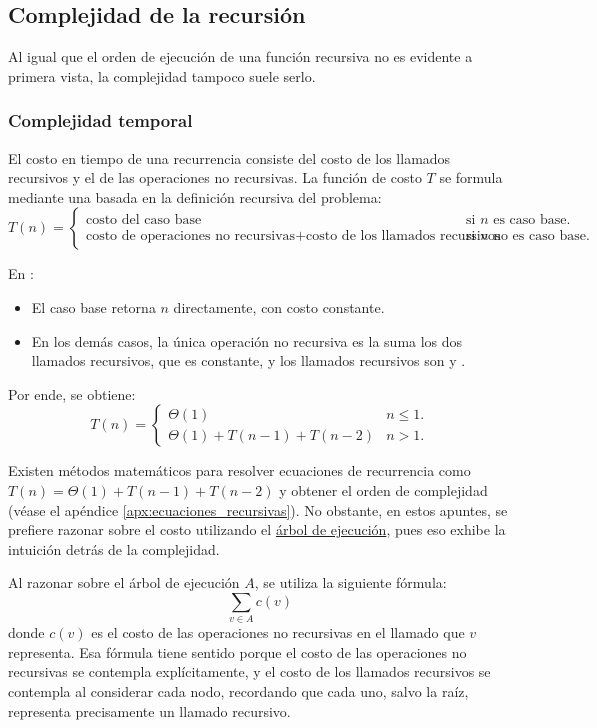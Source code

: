 \subsection{Complejidad de la recursión}

Al igual que el orden de ejecución de una función recursiva no es evidente a primera vista, la complejidad tampoco suele serlo.

\subsubsection{Complejidad temporal}
\label{sec:complejidad-temporal-recursion}

El costo en tiempo de una recurrencia consiste del costo de los llamados recursivos y el de las operaciones no recursivas. La función de costo \(T\) se formula mediante una  basada en la definición recursiva del problema:
\[
T(n) =
\begin{cases}
  \text{costo del caso base} & \text{si \(n\) es caso base.} \\
  \text{costo de operaciones no recursivas} + \text{costo de los llamados recursivos} & \text{si \(n\) no es caso base.}
\end{cases}
\]

En :
\begin{itemize}
  \item El caso base retorna $n$ directamente, con costo constante.
  \item En los demás casos, la única operación no recursiva es la suma los dos llamados recursivos, que es constante, y los llamados recursivos son  y .
\end{itemize}
Por ende, se obtiene:
\[
T(n) =
\begin{cases}
  \Theta(1) & n \le 1. \\
  \Theta(1) + T(n-1) + T(n-2) & n > 1.
\end{cases}
\]

Existen métodos matemáticos para resolver ecuaciones de recurrencia como \(T(n) = \Theta(1) + T(n-1) + T(n-2)\) y obtener el orden de complejidad (véase el apéndice \ref{apx:ecuaciones_recursivas}). No obstante, en estos apuntes, se prefiere razonar sobre el costo utilizando el \hyperref[sec:arbol_de_ejecucion]{árbol de ejecución}, pues eso exhibe la intuición detrás de la complejidad. 

Al razonar sobre el árbol de ejecución \(A\), se utiliza la siguiente fórmula: 
\[\sum_{v \in A} c(v)\]
donde \(c(v)\) es el costo de las operaciones no recursivas en el llamado que \(v\) representa. Esa fórmula tiene sentido porque el costo de las operaciones no recursivas se contempla explícitamente, y el costo de los llamados recursivos se contempla al considerar cada nodo, recordando que cada uno, salvo la raíz, representa precisamente un llamado recursivo. 

